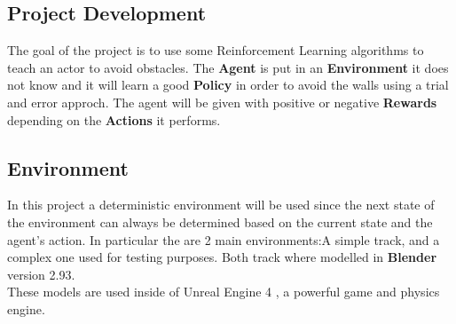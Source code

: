 \documentclass[14pt]{extarticle}
\def\sp{\vspace{5pt}}
\begin{document}
\newpage
\begin{center}
	\section{Project Development}
	\sp
\end{center}
\begin{flushleft}
	The goal of the project is to use some Reinforcement Learning algorithms to teach an actor to avoid obstacles. The \textbf{Agent} is put in an \textbf{Environment} it does not know and it will learn a good \textbf{Policy} in order to avoid the walls using a trial and error approch. The agent will be given with positive or negative \textbf{Rewards} depending on the \textbf{Actions} it performs. 
	
	\subsection{Environment}
	\sp
	In this project a deterministic environment will be used since the next state of the environment can always be determined based on the current state and the agent’s action. In particular the are 2 main environments:A simple track, and a complex one used for testing purposes. Both track where modelled in \textbf{Blender} version 2.93\cite{Blender}. \\
	These models are used inside of Unreal Engine 4 \cite{UE4}, a powerful game and physics engine.
	

\end{flushleft}
\end{document}
